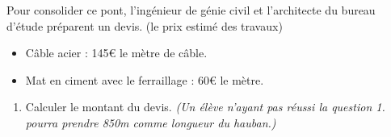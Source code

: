 Pour consolider ce pont, l'ingénieur de génie civil et l'architecte du bureau d'étude préparent un devis. (le prix estimé des travaux)

\begin{itemize}[label={$\bullet$}]
  \item Câble acier : 145€ le mètre de câble.
  \item Mat en ciment avec le ferraillage : 60€ le mètre. 
\end{itemize}

\begin{enumerate}
  \item[2.] Calculer le montant du devis. \newline
  \textit{(Un élève n'ayant pas réussi la question 1. pourra prendre 850m comme longueur du hauban.) }
\end{enumerate}

